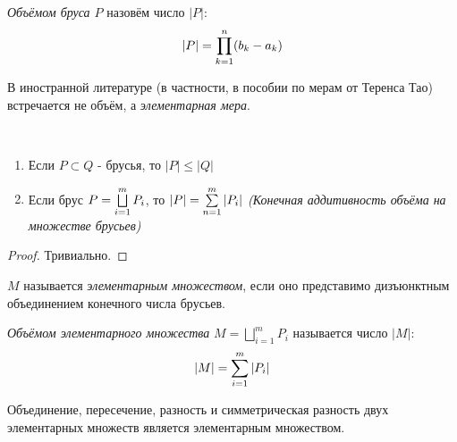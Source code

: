 \begin{definition}
	\textit{Объёмом бруса $P$} назовём число $|P|$:
	\[
		|P| = \prod\limits_{k = 1}^n (b_k - a_k)
	\]
\end{definition}

\begin{anote}
	В иностранной литературе (в частности, в пособии по мерам от Теренса Тао) встречается не объём, а \textit{элементарная мера}.
\end{anote}

\begin{proposition}~
	\begin{enumerate}
		\item Если $P \subset Q$ - брусья, то $|P| \le |Q|$
		
		\item Если брус $P = \bigsqcup\limits_{i = 1}^m P_i$, то $|P| = \sum\limits_{n = 1}^m |P_i|$ \textit{(Конечная аддитивность объёма на множестве брусьев)}
	\end{enumerate}
\end{proposition}

\begin{proof}
	Тривиально.
\end{proof}

\begin{definition}
	$M$ называется \textit{элементарным множеством}, если оно представимо дизъюнктным объединением конечного числа брусьев.
\end{definition}

\begin{definition}
	\textit{Объёмом элементарного множества} $M = \bigsqcup\limits_{i = 1}^m P_i$ называется число $|M|$:
	\[
		|M| = \sum\limits_{i = 1}^m |P_i|
	\]
\end{definition}

\begin{lemma}
	Объединение, пересечение, разность и симметрическая разность двух элементарных множеств является элементарным множеством.
\end{lemma}

\begin{center}
\end{center}

